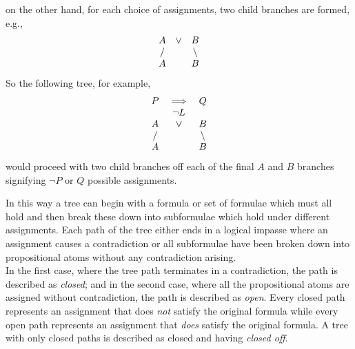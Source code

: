 \documentclass[../MathsNotesBase.tex]{subfiles}
\begin{document}
{ 		on the other hand, for each choice of assignments, two child branches are formed, e.g.,
 			\[ 
 				\begin{array}{*3c}
 					A & \lor & B  \\
 					/ &      & \backslash \\
 					A &      & B
 				\end{array}
 			\]
 		So the following tree, for example,
 			\[ 
	 			\begin{array}{*3c}
	 				P & \implies & Q \\
	 				  & \lnot L  & \\
	 				A & \lor & B  \\
	 				/ &      & \backslash \\
	 				A &      & B
	 			\end{array}
 			\]
 		would proceed with two child branches off each of the final $A$ and $B$ branches signifying $\lnot P$ or $Q$ possible assignments.\\
 		
 		
 		In this way a tree can begin with a formula or set of formulae which must all hold and then break these down into subformulae which hold under different assignments. Each path of the tree either ends in a logical impasse where an assignment causes a contradiction or all subformulae have been broken down into propositional atoms without any contradiction arising.\\
 		
 		In the first case, where the tree path terminates in a contradiction, the path is described as \textit{closed}; and in the second case, where all the propositional atoms are assigned without contradiction, the path is described as \textit{open}. Every closed path represents an assignment that does \textit{not} satisfy the original formula while every open path represents an assignment that \textit{does} satisfy the original formula. A tree with only closed paths is described as closed and having \textit{closed off}.
 		
 		
}
\end{document}

